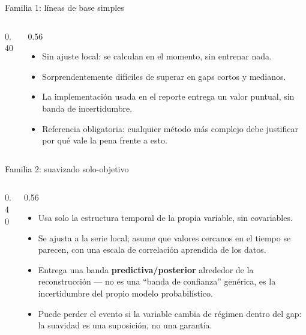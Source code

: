 \documentclass[aspectratio=169,11pt]{beamer}
\begin{document}

\begin{frame}[t]{Familia 1: líneas de base simples}
  \vskip4pt
  \begin{columns}[T]
    \begin{column}{0.40\textwidth}
      \centering
    \end{column}
    \begin{column}{0.56\textwidth}
      \vskip0.3cm
      {\footnotesize
      \begin{itemize}\setlength\itemsep{0.20cm}
        \item Sin ajuste local: se calculan en el momento, sin entrenar nada.
        \item Sorprendentemente difíciles de superar en gaps cortos y medianos.
        \item La implementación usada en el reporte entrega un valor puntual, sin banda
          de incertidumbre.
        \item Referencia obligatoria: cualquier método más complejo debe justificar por
          qué vale la pena frente a esto.
      \end{itemize}}
    \end{column}
  \end{columns}
\end{frame}

\begin{frame}[t]{Familia 2: suavizado solo-objetivo}
  \vskip4pt
  \begin{columns}[T]
    \begin{column}{0.40\textwidth}
      \centering
    \end{column}
    \begin{column}{0.56\textwidth}
      \vskip0.3cm
      {\footnotesize
      \begin{itemize}\setlength\itemsep{0.20cm}
        \item Usa solo la estructura temporal de la propia variable, sin covariables.
        \item Se ajusta a la serie local; asume que valores cercanos en el tiempo se
          parecen, con una escala de correlación aprendida de los datos.
        \item Entrega una banda \textbf{predictiva/posterior} alrededor de la
          reconstrucción --- no es una ``banda de confianza'' genérica, es la
          incertidumbre del propio modelo probabilístico.
        \item Puede perder el evento si la variable cambia de régimen dentro del gap: la
          suavidad es una suposición, no una garantía.
      \end{itemize}}
    \end{column}
  \end{columns}
\end{frame}
\end{document}
